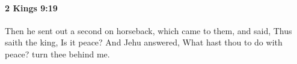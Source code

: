 
		\paragraph{2 Kings 9:19} %
			\label{2KINGS-9-19}

			Then he sent out a second on horseback, which came to them, and said, Thus saith the king, Is it peace? And Jehu answered, What hast thou to do with peace? turn thee behind me.


